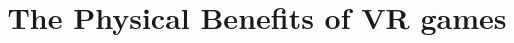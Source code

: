 \documentclass{sig-alternate-05-2015}
\begin{document}






%

\title{The Physical Benefits of VR games}
%
%
%
%
%
\end{document}
